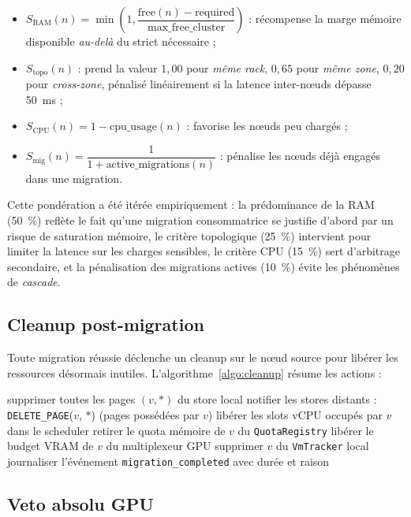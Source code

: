 \begin{itemize}[leftmargin=*]
    \item $S_{\text{RAM}}(n) = \min\!\left(1, \dfrac{\text{free}(n) - \text{required}}{\text{max\_free\_cluster}}\right)$ : récompense la marge mémoire disponible \emph{au-delà} du strict nécessaire ;
    \item $S_{\text{topo}}(n)$ : prend la valeur $1{,}00$ pour \emph{même rack}, $0{,}65$ pour \emph{même zone}, $0{,}20$ pour \emph{cross-zone}, pénalisé linéairement si la latence inter-nœuds dépasse 50~ms ;
    \item $S_{\text{CPU}}(n) = 1 - \text{cpu\_usage}(n)$ : favorise les nœuds peu chargés ;
    \item $S_{\text{mig}}(n) = \dfrac{1}{1 + \text{active\_migrations}(n)}$ : pénalise les nœuds déjà engagés dans une migration.
\end{itemize}

Cette pondération a été itérée empiriquement : la prédominance de la RAM (50~\%) reflète le fait qu'une migration consommatrice se justifie d'abord par un risque de saturation mémoire, le critère topologique (25~\%) intervient pour limiter la latence sur les charges sensibles, le critère CPU (15~\%) sert d'arbitrage secondaire, et la pénalisation des migrations actives (10~\%) évite les phénomènes de \emph{cascade}.

\subsection{Cleanup post-migration}

Toute migration réussie déclenche un cleanup sur le nœud source pour libérer les ressources désormais inutiles. L'algorithme~\ref{algo:cleanup} résume les actions :

\begin{algorithm}[H]
\caption{Cleanup après migration réussie}
\label{algo:cleanup}
supprimer toutes les pages $(v, *)$ du store local\;
notifier les stores distants : \texttt{DELETE\_PAGE}($v$, $*$) (pages possédées par $v$)\;
libérer les slots vCPU occupés par $v$ dans le scheduler\;
retirer le quota mémoire de $v$ du \texttt{QuotaRegistry}\;
libérer le budget VRAM de $v$ du multiplexeur GPU\;
supprimer $v$ du \texttt{VmTracker} local\;
journaliser l'événement \texttt{migration\_completed} avec durée et raison\;
\end{algorithm}

\subsection{Veto absolu GPU}

